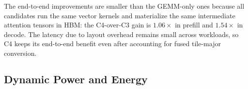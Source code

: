 \documentclass[sigconf,anonymous,nonacm]{acmart}
\begin{document}

The end-to-end improvements are smaller than the GEMM-only ones because all candidates run the same vector kernels and materialize the same intermediate attention tensors in HBM: the C4-over-C3 gain is $1.06\times$ in prefill and $1.54\times$ in decode. %
The latency due to layout overhead remains small across workloads, so C4 keeps its end-to-end benefit even after accounting for fused tile-major conversion.

\subsection{Dynamic Power and Energy}
\end{document}
